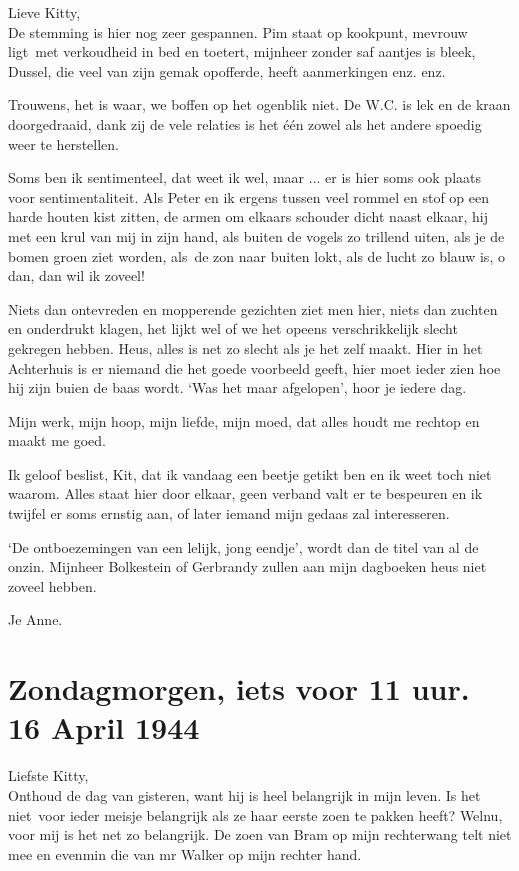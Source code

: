 \documentclass{book}
\begin{document}
Lieve Kitty,\\De stemming is hier nog zeer gespannen. Pim staat op
kookpunt, mevrouw ligt~met verkoudheid in bed en toetert, mijnheer
zonder saf aantjes is bleek, Dussel, die veel van zijn gemak opofferde,
heeft aanmerkingen enz. enz.

Trouwens, het is waar, we boffen op het ogenblik niet. De W.C. is lek en
de kraan doorgedraaid, dank zij de vele relaties is het één zowel als
het andere spoedig weer te herstellen.

Soms ben ik sentimenteel, dat weet ik wel, maar ... er is hier soms ook
plaats voor sentimentaliteit. Als Peter en ik ergens tussen veel rommel
en stof op een harde houten kist zitten, de armen om elkaars schouder
dicht naast elkaar, hij met een krul van mij in zijn hand, als buiten de
vogels zo trillend uiten, als je de bomen groen ziet worden, als~de zon
naar buiten lokt, als de lucht zo blauw is, o dan, dan wil ik zoveel!

Niets dan ontevreden en mopperende gezichten ziet men hier, niets dan
zuchten en onderdrukt klagen, het lijkt wel of we het opeens
verschrikkelijk slecht gekregen hebben. Heus, alles is net zo slecht als
je het zelf maakt. Hier in het Achterhuis is er niemand die het goede
voorbeeld geeft, hier moet ieder zien hoe hij zijn buien de baas wordt.
`Was het maar afgelopen', hoor je iedere dag.

Mijn werk, mijn hoop, mijn liefde, mijn moed, dat alles houdt me rechtop
en maakt me goed.

Ik geloof beslist, Kit, dat ik vandaag een beetje getikt ben en ik weet
toch niet waarom. Alles staat hier door elkaar, geen verband valt er te
bespeuren en ik twijfel er soms ernstig aan, of later iemand mijn gedaas
zal interesseren.

`De ontboezemingen van een lelijk, jong eendje', wordt dan de titel van
al de onzin. Mijnheer Bolkestein of Gerbrandy zullen aan mijn dagboeken
heus niet zoveel hebben.

Je Anne.

\chapter{Zondagmorgen, iets voor 11 uur. 16 April 1944}

Liefste Kitty,\\Onthoud de dag van gisteren, want hij is heel belangrijk
in mijn leven. Is het niet~voor ieder meisje belangrijk als ze haar
eerste zoen te pakken heeft? Welnu, voor mij is het net zo belangrijk.
De zoen van Bram op mijn rechterwang telt niet mee en evenmin die van mr
Walker op mijn rechter hand.
\end{document}
